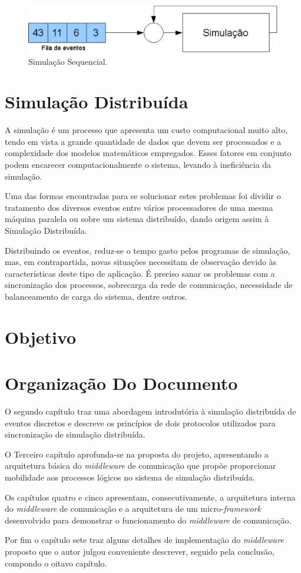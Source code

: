 \begin{figure}
  \centerline{\includegraphics[scale=0.6]{simulacao.eps}}
  \caption{Simulação Sequencial.}
\label{fig:simul}
\end{figure}

\section{Simulação Distribuída}

A simulação é um processo que apresenta um custo computacional muito alto, tendo em vista a grande quantidade de dados que devem ser processados e a complexidade dos modelos matemáticos empregados. Esses fatores em conjunto podem encarecer computacionalmente o sistema, levando à ineficiência da simulação.

Uma das formas encontradas para se solucionar estes problemas foi dividir o tratamento dos diversos eventos entre vários processadores de uma mesma máquina paralela ou sobre um sistema distribuído, dando origem assim à Simulação Distribuída.

Distribuindo os eventos, reduz-se o tempo gasto pelos programas de simulação, mas, em contrapartida, novas situações necessitam de observação devido às características deste tipo de aplicação. É preciso sanar os problemas com a sincronização dos processos, sobrecarga da rede de comunicação, necessidade de balanceamento de carga do sistema, dentre outros.



\section{Objetivo}
\section{Organização Do Documento}

O segundo capítulo traz uma abordagem introdutória à simulação distribuída de eventos discretos e descreve os princípios de dois protocolos utilizados para sincronização de simulação distribuída.

O Terceiro capítulo aprofunda-se na proposta do projeto, apresentando a arquitetura básica do \textit{middleware} de comunicação que propõe proporcionar mobilidade aos processos lógicos no sistema de simulação distribuída. 

Os capítulos quatro e cinco apresentam, consecutivamente, a arquitetura interna do \textit{middleware} de comunicação e a arquitetura de um micro-\textit{framework} desenvolvido para demonstrar o funcionamento do \textit{middleware} de comunicação.

Por fim o capítulo sete traz alguns detalhes de implementação do \textit{middleware} proposto que o autor julgou conveniente descrever, seguido pela conclusão, compondo o oitavo capítulo.
